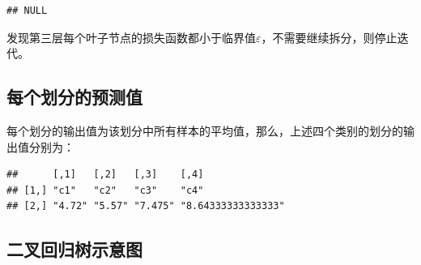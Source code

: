 \documentclass[
]{ctexart}
\newenvironment{Shaded}{\begin{snugshade}}{\end{snugshade}}
\newcommand{\DecValTok}[1]{\textcolor[rgb]{0.00,0.00,0.81}{#1}}
\newcommand{\FunctionTok}[1]{\textcolor[rgb]{0.13,0.29,0.53}{\textbf{#1}}}
\newcommand{\NormalTok}[1]{#1}
\newcommand{\OtherTok}[1]{\textcolor[rgb]{0.56,0.35,0.01}{#1}}
\newcommand{\SpecialCharTok}[1]{\textcolor[rgb]{0.81,0.36,0.00}{\textbf{#1}}}
\newcommand{\StringTok}[1]{\textcolor[rgb]{0.31,0.60,0.02}{#1}}
\begin{document}
\begin{verbatim}
## NULL
\end{verbatim}

发现第三层每个叶子节点的损失函数都小于临界值\(\varepsilon\)，不需要继续拆分，则停止迭代。

\hypertarget{ux6bcfux4e2aux5212ux5206ux7684ux9884ux6d4bux503c}{%
\subsection{每个划分的预测值}\label{ux6bcfux4e2aux5212ux5206ux7684ux9884ux6d4bux503c}}

每个划分的输出值为该划分中所有样本的平均值，那么，上述四个类别的划分的输出值分别为：

\begin{Shaded}
\end{Shaded}

\begin{verbatim}
##      [,1]   [,2]   [,3]    [,4]              
## [1,] "c1"   "c2"   "c3"    "c4"              
## [2,] "4.72" "5.57" "7.475" "8.64333333333333"
\end{verbatim}

\hypertarget{ux4e8cux53c9ux56deux5f52ux6811ux793aux610fux56fe}{%
\subsection{二叉回归树示意图}\label{ux4e8cux53c9ux56deux5f52ux6811ux793aux610fux56fe}}
\end{document}
